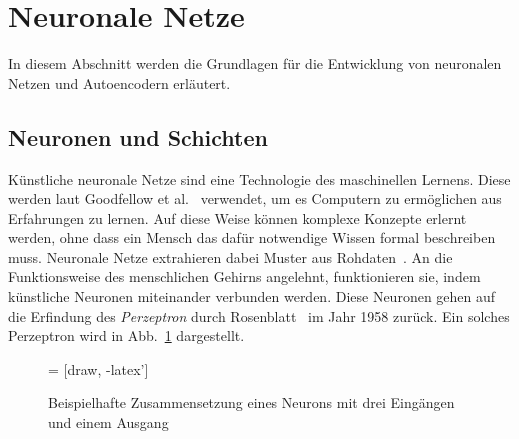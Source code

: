\section{Neuronale Netze}
In diesem Abschnitt werden die Grundlagen für die Entwicklung von neuronalen Netzen und Autoencodern erläutert.

\subsection{Neuronen und Schichten}
\label{subsec:activation}
Künstliche neuronale Netze sind eine Technologie des maschinellen Lernens. Diese werden laut Goodfellow et al.~\cite[S. 1-2]{goodfellowDeepLearningUmfassende2018} verwendet, um es Computern zu ermöglichen aus Erfahrungen zu lernen. Auf diese Weise können komplexe Konzepte erlernt werden, ohne dass ein Mensch das dafür notwendige Wissen formal beschreiben muss. Neuronale Netze extrahieren dabei Muster aus Rohdaten~\cite[S. 3]{goodfellowDeepLearningUmfassende2018}. An die Funktionsweise des menschlichen Gehirns angelehnt, funktionieren sie, indem künstliche Neuronen miteinander verbunden werden. Diese Neuronen gehen auf die Erfindung des \emph{Perzeptron} durch Rosenblatt~\cite{rosenblattPerceptronProbabilisticModel1958} im Jahr 1958 zurück. Ein solches Perzeptron wird in Abb.~\ref{fig:perceptron} dargestellt.

\begin{figure}[htbp]
    \centering
     = [draw, -latex']
    \caption{Beispielhafte Zusammensetzung eines Neurons mit drei Eingängen und einem Ausgang~\cite[S. 28]{kaulTheoreticalCharacterizationDeep2020}}
    \label{fig:perceptron}
\end{figure}

